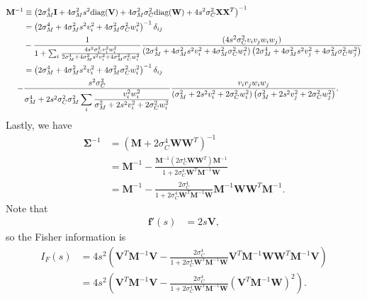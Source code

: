 \documentclass[11pt]{article}
\begin{document}
	\begin{align}
	\mathbf{M}^{-1} &\equiv \left(2\sigma_M^4 \mathbf{I} +4\sigma_M^2 s^2 \text{diag}(\mathbf{V}) + 4\sigma_M^2 \sigma_C^2 \text{diag}(\mathbf{W}) + 4s^2 \sigma_C^2 \mathbf{X}\mathbf{X}^T\right)^{-1} \\
	&= \left(2\sigma_M^4 + 4\sigma_M^2 s^2 v_i^2 + 4\sigma_M^2 \sigma_C^2 w_i^2\right)^{-1}\delta_{ij} \notag \\
	& - \frac{1}{1 + \sum_i\frac{4s^2\sigma_C^2 v_i^2 w_i^2}{2\sigma_M^4 + 4\sigma_M^2 s^2 v_i^2 + 4\sigma_M^2 \sigma_C^2 w_i^2}}\frac{(4s^2 \sigma_C^2 v_i v_j w_i w_j)}{\left(2\sigma_M^4 + 4\sigma_M^2 s^2 v_i^2 + 4\sigma_M^2 \sigma_C^2 w_i^2\right)\left(2\sigma_M^4 + 4\sigma_M^2 s^2 v_j^2 + 4\sigma_M^2 \sigma_C^2 w_j^2\right)}\notag \\
	&=  \left(2\sigma_M^4 + 4\sigma_M^2 s^2 v_i^2 + 4\sigma_M^2 \sigma_C^2 w_i^2\right)^{-1}\delta_{ij} \notag \\
	 - &\frac{s^2\sigma_C^2}{\sigma_M^4 +2s^2\sigma_C^2 \sigma_M^2\displaystyle\sum_i\frac{v_i^2 w_i^2}{\sigma_M^2+ 2s^2 v_i^2 + 2 \sigma_C^2 w_i^2}} \frac{ v_i v_j w_i w_j}{\left(\sigma_M^2 + 2s^2 v_i^2 + 2 \sigma_C^2 w_i^2\right)\left(\sigma_M^2 + 2 s^2 v_j^2 + 2\sigma_C^2 w_j^2\right)}.
	\end{align}
	Lastly, we have 
	\begin{align}
	\boldsymbol{\Sigma}^{-1} &= (\mathbf{M} + 2\sigma_C^4 \mathbf{W}\mathbf{W}^T)^{-1} \\
	&= \mathbf{M}^{-1} - \frac{\mathbf{M}^{-1} (2\sigma_C^4 \mathbf{W}\mathbf{W}^T) \mathbf{M}^{-1}}{1 + 2\sigma_C^4 \mathbf{W}^T\mathbf{M}^{-1}\mathbf{W}} \\
	&= \mathbf{M}^{-1} - \frac{2\sigma_C^4}{1 + 2\sigma_C^4 \mathbf{W}^T\mathbf{M}^{-1} \mathbf{W}} \mathbf{M}^{-1}\mathbf{W}\mathbf{W}^T\mathbf{M}^{-1}.
	\end{align}
	Note that
	\begin{align}
	\mathbf{f}'(s) &= 2 s \mathbf{V},
	\end{align}
	so the Fisher information is
	\begin{align}
	I_F(s) &= 4s^2 \left(\mathbf{V}^T \mathbf{M}^{-1} \mathbf{V} - \frac{2\sigma_C^4}{1 + 2\sigma_C^4 \mathbf{W}^T\mathbf{M}^{-1} \mathbf{W}} \mathbf{V}^T \mathbf{M}^{-1} \mathbf{W} \mathbf{W}^T \mathbf{M}^{-1}\mathbf{V}\right) \\
	&= 4s^2 \left(\mathbf{V}^T \mathbf{M}^{-1} \mathbf{V}-  \frac{2\sigma_C^4}{1 + 2\sigma_C^4 \mathbf{W}^T\mathbf{M}^{-1} \mathbf{W}} \left(\mathbf{V}^T\mathbf{M}^{-1} \mathbf{W}\right)^{2}\right).
	\end{align}
\end{document}
